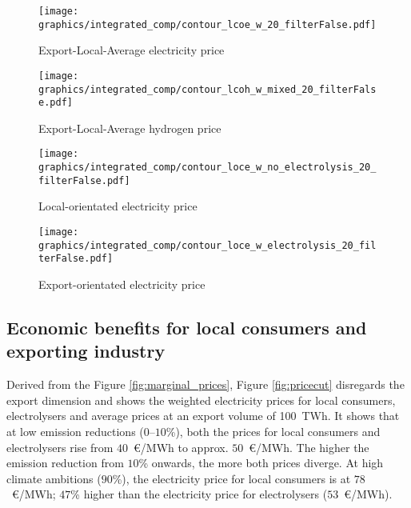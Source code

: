 \begin{figure*}[t] %
    \centering
    \begin{subfigure}[b]{0.45\linewidth}
        \centering
        \texttt{[image: graphics/integrated\_comp/contour\_lcoe\_w\_20\_filterFalse.pdf]}
        \caption{Export-Local-Average electricity price}
        \label{fig:export_local_el_price}
    \end{subfigure}
    \hfill
    \begin{subfigure}[b]{0.45\linewidth}
        \centering
        \texttt{[image: graphics/integrated\_comp/contour\_lcoh\_w\_mixed\_20\_filterFalse.pdf]}
        \caption{Export-Local-Average hydrogen price}
        \label{fig:export_local_hy_price}
    \end{subfigure}
    \hfill
    \begin{subfigure}[b]{0.45\linewidth}
        \centering
        \texttt{[image: graphics/integrated\_comp/contour\_loce\_w\_no\_electrolysis\_20\_filterFalse.pdf]}
        \caption{Local-orientated electricity price}
        \label{fig:local_el_price}
    \end{subfigure}
    \hfill
    \begin{subfigure}[b]{0.45\linewidth}
        \centering
        \texttt{[image: graphics/integrated\_comp/contour\_loce\_w\_electrolysis\_20\_filterFalse.pdf]}
        \caption{Export-orientated electricity price}
        \label{fig:export_el_price}
    \end{subfigure}
    \hfill

    \caption{Marginal prices of electricity and hydrogen subject to export volumes and emission limits depending on various weightings. Black lines indicate the lowest price at each emission limit.}
    \label{fig:marginal_prices}
\end{figure*}


\subsection{Economic benefits for local consumers and exporting industry}
\label{subsec:economic_benefits}
Derived from the Figure \ref{fig:marginal_prices}, Figure \ref{fig:pricecut} disregards the export dimension and shows the weighted electricity prices for local consumers, electrolysers and average prices at an export volume of 100~TWh. It shows that at low emission reductions ($0$--$10$\%), both the prices for local consumers and electrolysers rise from $40$~\euro/MWh to approx. $50$~\euro/MWh. The higher the emission reduction from $10$\% onwards, the more both prices diverge. At high climate ambitions ($90$\%), the electricity price for local consumers is at $78$~\euro/MWh; $47$\% higher than the electricity price for electrolysers ($53$~\euro/MWh).

